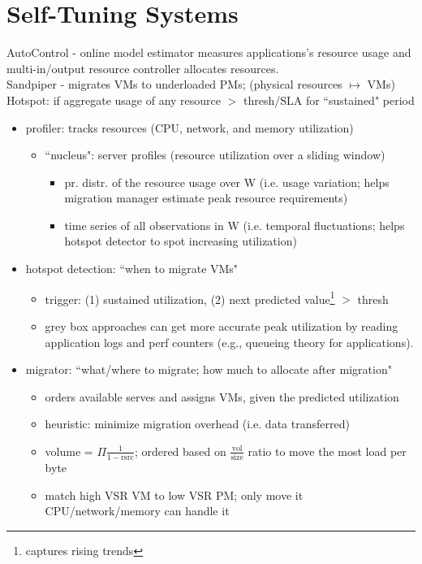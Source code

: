 \documentclass{article}
\begin{document}
\section{Self-Tuning Systems}
\noindent\cite{padala:eurosys2009-autocontrol} AutoControl - online model estimator measures applications's resource usage and multi-in/output resource controller allocates resources.\\

\noindent\cite{wood:nsdi07-sandpiper} Sandpiper - migrates VMs to underloaded PMs; (physical resources \(\mapsto\) VMs)
Hotspot: if aggregate usage of any resource \(>\) thresh/SLA for ``sustained" period
\begin{itemize}
	\item profiler: tracks resources (CPU, network, and memory utilization)
	\begin{itemize}
		\item ``nucleus": server profiles (resource utilization over a sliding window)
		\begin{itemize}
			\item pr. distr. of the resource usage over W (i.e. usage variation; helps migration manager estimate peak resource requirements)
			\item time series of all observations in W (i.e. temporal fluctuations; helps hotspot detector to spot increasing utilization)
		\end{itemize}
	\end{itemize}
	\item hotspot detection: ``when to migrate VMs"
	\begin{itemize}
		\item trigger: (1) sustained utilization, (2) next predicted value\footnote{captures rising trends} \(>\) thresh
		\item grey box approaches can get more accurate peak utilization by reading application logs and perf counters (e.g., queueing theory for applications). 
	\end{itemize}
	\item migrator: ``what/where to migrate; how much to allocate after migration"
	\begin{itemize}
		\item orders available serves and assigns VMs, given the predicted utilization
		\item heuristic: minimize migration overhead (i.e. data transferred)
		\item volume = \(\Pi\frac{1}{1 - \text{rsrc}}\); ordered based on \(\frac{\text{vol}}{\text{size}}\) ratio to move the most load per byte
		\item match high VSR VM to low VSR PM; only move it CPU/network/memory can handle it
	\end{itemize}
\end{itemize}
\end{document}
